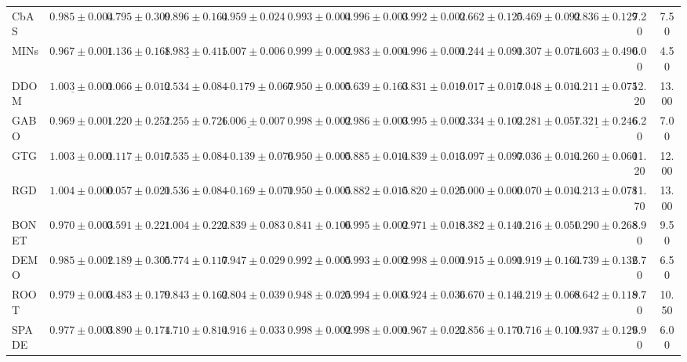 \begin{table}
{\begin{tabular}{lcccccccccccc}
CbAS & $0.985 \pm 0.004$ & $0.795 \pm 0.309$ & $0.896 \pm 0.164$ & $0.959 \pm 0.024$ & $0.993 \pm 0.004$ & $0.996 \pm 0.003$ & $0.992 \pm 0.002$ & $0.662 \pm 0.125$ & $0.469 \pm 0.092$ & $0.836 \pm 0.129$ & 7.20 & 7.50 \\
MINs & $0.967 \pm 0.001$ & $1.136 \pm 0.168$ & $\underline{1.983 \pm 0.415}$ & $\mathbf{1.007 \pm 0.006}$ & $0.999 \pm 0.002$ & $0.983 \pm 0.004$ & $0.996 \pm 0.001$ & $0.244 \pm 0.091$ & $0.307 \pm 0.074$ & $\mathbf{1.603 \pm 0.490}$ & 6.00 & 4.50 \\
DDOM & $\underline{1.003 \pm 0.001}$ & $0.066 \pm 0.012$ & $0.534 \pm 0.084$ & $-0.179 \pm 0.067$ & $0.950 \pm 0.005$ & $0.639 \pm 0.163$ & $0.831 \pm 0.019$ & $0.017 \pm 0.017$ & $0.048 \pm 0.014$ & $0.211 \pm 0.075$ & 12.20 & 13.00 \\
GABO & $0.969 \pm 0.001$ & $\mathbf{1.220 \pm 0.251}$ & $\mathbf{2.255 \pm 0.726}$ & $\underline{1.006 \pm 0.007}$ & $0.998 \pm 0.002$ & $0.986 \pm 0.003$ & $0.995 \pm 0.002$ & $0.334 \pm 0.102$ & $0.281 \pm 0.057$ & $\underline{1.321 \pm 0.246}$ & 6.20 & 7.00 \\
GTG & $1.003 \pm 0.001$ & $0.117 \pm 0.017$ & $0.535 \pm 0.084$ & $-0.139 \pm 0.076$ & $0.950 \pm 0.005$ & $0.885 \pm 0.014$ & $0.839 \pm 0.013$ & $0.097 \pm 0.097$ & $0.036 \pm 0.014$ & $0.260 \pm 0.060$ & 11.20 & 12.00 \\
RGD & $\mathbf{1.004 \pm 0.000}$ & $0.057 \pm 0.021$ & $0.536 \pm 0.084$ & $-0.169 \pm 0.071$ & $0.950 \pm 0.005$ & $0.882 \pm 0.015$ & $0.820 \pm 0.025$ & $0.000 \pm 0.000$ & $0.070 \pm 0.014$ & $0.213 \pm 0.078$ & 11.70 & 13.00 \\
BONET & $0.970 \pm 0.003$ & $0.591 \pm 0.221$ & $1.004 \pm 0.222$ & $0.839 \pm 0.083$ & $0.841 \pm 0.106$ & $0.995 \pm 0.002$ & $0.971 \pm 0.018$ & $0.382 \pm 0.141$ & $0.216 \pm 0.050$ & $1.290 \pm 0.268$ & 8.90 & 9.50 \\
DEMO & $0.985 \pm 0.002$ & $\underline{1.189 \pm 0.305}$ & $0.774 \pm 0.117$ & $0.947 \pm 0.029$ & $0.992 \pm 0.005$ & $0.993 \pm 0.002$ & $0.998 \pm 0.001$ & $0.915 \pm 0.091$ & $0.919 \pm 0.164$ & $0.739 \pm 0.132$ & 6.70 & 6.50 \\
ROOT & $0.979 \pm 0.003$ & $0.483 \pm 0.179$ & $0.843 \pm 0.162$ & $0.804 \pm 0.039$ & $0.948 \pm 0.025$ & $0.994 \pm 0.003$ & $0.924 \pm 0.036$ & $0.670 \pm 0.144$ & $0.219 \pm 0.068$ & $0.642 \pm 0.118$ & 9.70 & 10.50 \\
SPADE & $0.977 \pm 0.003$ & $0.890 \pm 0.174$ & $1.710 \pm 0.814$ & $0.916 \pm 0.033$ & $0.998 \pm 0.002$ & $0.998 \pm 0.001$ & $0.967 \pm 0.022$ & $0.856 \pm 0.170$ & $0.716 \pm 0.101$ & $0.937 \pm 0.129$ & 6.90 & 6.00 \\

\end{tabular}}
\end{table}

